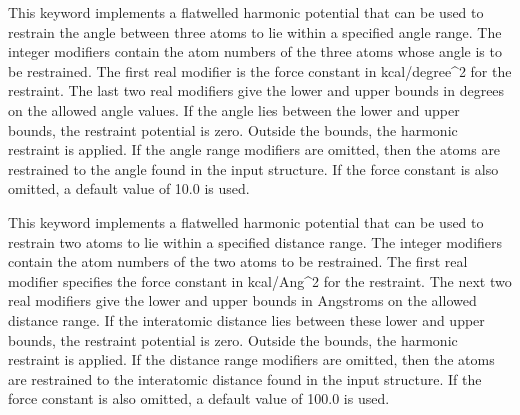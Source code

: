 \documentclass[letterpaper,11pt,english]{sphinxmanual}
\begin{document}











  This keyword implements a flat\sphinxhyphen{}welled harmonic potential that can be used to restrain the angle between three atoms to lie within a specified angle range. The integer modifiers contain the atom numbers of the three atoms whose angle is to be restrained.  The first real modifier is the force constant in kcal/degree\textasciicircum{}2 for the restraint. The last two real modifiers give the lower and upper bounds in degrees on the allowed angle values. If the angle lies between the lower and upper bounds, the restraint potential is zero. Outside the bounds, the harmonic restraint is applied. If the angle range modifiers are omitted, then the atoms are restrained to the angle found in the input structure. If the force constant is also omitted, a default value of 10.0 is used.

  This keyword implements a flat\sphinxhyphen{}welled harmonic potential that can be used to restrain two atoms to lie within a specified distance range. The integer modifiers contain the atom numbers of the two atoms to be restrained. The first real modifier specifies the force constant in kcal/Ang\textasciicircum{}2 for the restraint. The next two real modifiers give the lower and upper bounds in Angstroms on the allowed distance range. If the interatomic distance lies between these lower and upper bounds, the restraint potential is zero. Outside the bounds, the harmonic restraint is applied. If the distance range modifiers are omitted, then the atoms are restrained to the interatomic distance found in the input structure. If the force constant is also omitted, a default value of 100.0 is used.
\end{document}
